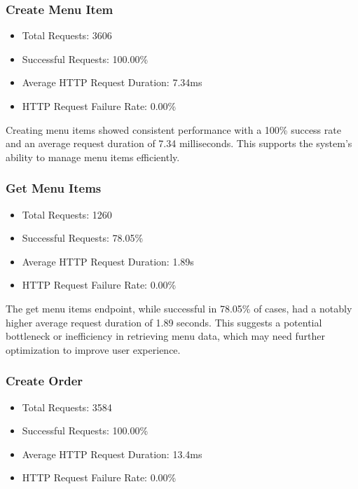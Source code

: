 \documentclass{article}
\begin{document}
\subsubsection*{Create Menu Item}

\begin{itemize}
  \item Total Requests: 3606
  \item Successful Requests: 100.00\%
  \item Average HTTP Request Duration: 7.34ms
  \item HTTP Request Failure Rate: 0.00\%
\end{itemize}

Creating menu items showed consistent performance with a 100\% success rate and an average request duration of 7.34 milliseconds. This supports the system's ability to manage menu items efficiently.

\subsubsection*{Get Menu Items}

\begin{itemize}
  \item Total Requests: 1260
  \item Successful Requests: 78.05\%
  \item Average HTTP Request Duration: 1.89s
  \item HTTP Request Failure Rate: 0.00\%
\end{itemize}

The get menu items endpoint, while successful in 78.05\% of cases, had a notably higher average request duration of 1.89 seconds. This suggests a potential bottleneck or inefficiency in retrieving menu data, which may need further optimization to improve user experience.

\subsubsection*{Create Order}
\begin{itemize}
  \item Total Requests: 3584
  \item Successful Requests: 100.00\%
  \item Average HTTP Request Duration: 13.4ms
  \item HTTP Request Failure Rate: 0.00\%
\end{itemize}
\end{document}
